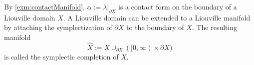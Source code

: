 



By \cref{exm:contactManifold},  $\alpha:= \lambda|_{\partial X}$ is a contact form on the boundary of a Liouville domain $X$.  A Liouville domain can be extended to a Liouville manifold by attaching the symplectization of $\partial X$ to the boundary of $X$. The resulting manifold
\[\hat X := X\cup_{\partial X} ([0, \infty)\times \partial X)\]
is called the symplectic completion of $X$.


